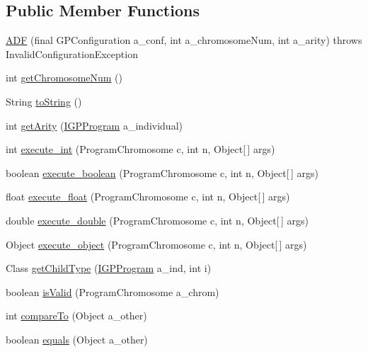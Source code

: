 \subsection*{Public Member Functions}
\begin{DoxyCompactItemize}
\item 
\hyperlink{classorg_1_1jgap_1_1gp_1_1function_1_1_a_d_f_a847d2c99357b56047b13551abd009838}{A\-D\-F} (final G\-P\-Configuration a\-\_\-conf, int a\-\_\-chromosome\-Num, int a\-\_\-arity)  throws Invalid\-Configuration\-Exception 
\item 
int \hyperlink{classorg_1_1jgap_1_1gp_1_1function_1_1_a_d_f_ac4f7984d06634b4eda77c2dd8a3e8d2a}{get\-Chromosome\-Num} ()
\item 
String \hyperlink{classorg_1_1jgap_1_1gp_1_1function_1_1_a_d_f_a15d9b81c9ba10c9ba3c08eac71c85bcc}{to\-String} ()
\item 
int \hyperlink{classorg_1_1jgap_1_1gp_1_1function_1_1_a_d_f_aa9955babf21d5aba4be7326fd38b13d4}{get\-Arity} (\hyperlink{interfaceorg_1_1jgap_1_1gp_1_1_i_g_p_program}{I\-G\-P\-Program} a\-\_\-individual)
\item 
int \hyperlink{classorg_1_1jgap_1_1gp_1_1function_1_1_a_d_f_a0d037be27a91fd6c6aa37c4f9a8bfa21}{execute\-\_\-int} (Program\-Chromosome c, int n, Object\mbox{[}$\,$\mbox{]} args)
\item 
boolean \hyperlink{classorg_1_1jgap_1_1gp_1_1function_1_1_a_d_f_a9cdf0e931c26d5b3f4fb4d6c23363dbe}{execute\-\_\-boolean} (Program\-Chromosome c, int n, Object\mbox{[}$\,$\mbox{]} args)
\item 
float \hyperlink{classorg_1_1jgap_1_1gp_1_1function_1_1_a_d_f_af2fdf778c30d9645c686807989e5f1be}{execute\-\_\-float} (Program\-Chromosome c, int n, Object\mbox{[}$\,$\mbox{]} args)
\item 
double \hyperlink{classorg_1_1jgap_1_1gp_1_1function_1_1_a_d_f_a4a89b6b9b2ec1bcc037f3e566c627bf5}{execute\-\_\-double} (Program\-Chromosome c, int n, Object\mbox{[}$\,$\mbox{]} args)
\item 
Object \hyperlink{classorg_1_1jgap_1_1gp_1_1function_1_1_a_d_f_a5acdafb1afbe577cd690df67d319ed62}{execute\-\_\-object} (Program\-Chromosome c, int n, Object\mbox{[}$\,$\mbox{]} args)
\item 
Class \hyperlink{classorg_1_1jgap_1_1gp_1_1function_1_1_a_d_f_a055c28c2508cd2e55b2c13f045e1860f}{get\-Child\-Type} (\hyperlink{interfaceorg_1_1jgap_1_1gp_1_1_i_g_p_program}{I\-G\-P\-Program} a\-\_\-ind, int i)
\item 
boolean \hyperlink{classorg_1_1jgap_1_1gp_1_1function_1_1_a_d_f_a5e377b15d81ca7ceec156614480980d7}{is\-Valid} (Program\-Chromosome a\-\_\-chrom)
\item 
int \hyperlink{classorg_1_1jgap_1_1gp_1_1function_1_1_a_d_f_a8be802e15802a035a5e3b7ffdffa6956}{compare\-To} (Object a\-\_\-other)
\item 
boolean \hyperlink{classorg_1_1jgap_1_1gp_1_1function_1_1_a_d_f_ab0a98d44026a977f9bb0515c73fede00}{equals} (Object a\-\_\-other)
\end{DoxyCompactItemize}
